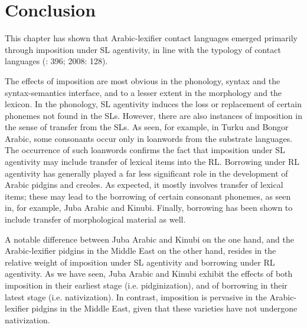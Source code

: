 \documentclass[output=paper]{langsci/langscibook}
\begin{document}
\section{Conclusion}\label{sec:conc}

This chapter has shown that Arabic-lexifier contact languages emerged primarily through imposition under SL agentivity, in line with the typology of contact languages (\citealt{Winford2005}: 396; 2008: 128). 

The effects of imposition are most obvious in the phonology, syntax and the syntax-semantics interface, and to a lesser extent in the morphology and the lexicon. In the phonology, SL agentivity induces the loss or replacement of certain phonemes not found in the SLs. However, there are also instances of imposition in the sense of transfer from the SLs. As seen, for example, in Turku and Bongor Arabic, some consonants occur only in loanwords from the substrate languages. The occurrence of such loanwords confirms the fact that imposition under SL agentivity may include transfer of lexical items into the RL. Borrowing under RL agentivity has generally played a far less significant role in the development of Arabic pidgins and creoles. As expected, it mostly involves transfer of lexical items; these may lead to the borrowing of certain consonant phonemes, as seen in, for example, Juba Arabic and Kinubi. Finally, borrowing has been shown to include transfer of morphological material as well.

A notable difference between Juba Arabic and Kinubi on the one hand, and the Arabic-lexifier pidgins in the Middle East on the other hand, resides in the relative weight of imposition under SL agentivity and borrowing under RL agentivity. As we have seen, Juba Arabic and Kinubi exhibit the effects of both imposition in their earliest stage (i.e. pidginization), and of borrowing in their latest stage (i.e. nativization). In contrast, imposition is pervasive in the Arabic-lexifier pidgins in the Middle East, given that these varieties have not undergone nativization.
\end{document}
